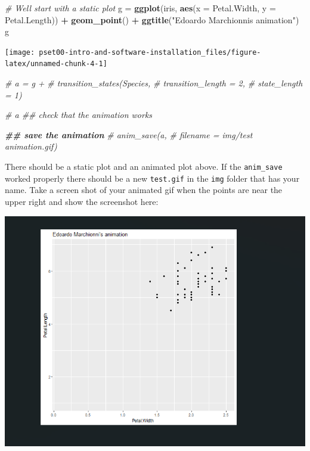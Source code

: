 \documentclass[
]{article}
\newenvironment{Shaded}{\begin{snugshade}}{\end{snugshade}}
\newcommand{\AttributeTok}[1]{\textcolor[rgb]{0.13,0.29,0.53}{#1}}
\newcommand{\CommentTok}[1]{\textcolor[rgb]{0.56,0.35,0.01}{\textit{#1}}}
\newcommand{\DocumentationTok}[1]{\textcolor[rgb]{0.56,0.35,0.01}{\textbf{\textit{#1}}}}
\newcommand{\FunctionTok}[1]{\textcolor[rgb]{0.13,0.29,0.53}{\textbf{#1}}}
\newcommand{\NormalTok}[1]{#1}
\newcommand{\OtherTok}[1]{\textcolor[rgb]{0.56,0.35,0.01}{#1}}
\newcommand{\SpecialCharTok}[1]{\textcolor[rgb]{0.81,0.36,0.00}{\textbf{#1}}}
\newcommand{\StringTok}[1]{\textcolor[rgb]{0.31,0.60,0.02}{#1}}
\begin{document}
\begin{Shaded}
\begin{Highlighting}[]
\CommentTok{\# We\textquotesingle{}ll start with a static plot}
\NormalTok{g }\OtherTok{=} \FunctionTok{ggplot}\NormalTok{(iris, }
            \FunctionTok{aes}\NormalTok{(}\AttributeTok{x =}\NormalTok{ Petal.Width, }
                \AttributeTok{y =}\NormalTok{ Petal.Length)) }\SpecialCharTok{+} 
  \FunctionTok{geom\_point}\NormalTok{() }\SpecialCharTok{+} 
  \FunctionTok{ggtitle}\NormalTok{(}\StringTok{"Edoardo Marchionni\textquotesingle{}s animation"}\NormalTok{)}
\NormalTok{g}
\end{Highlighting}
\end{Shaded}

\begin{center}\texttt{[image: pset00-intro-and-software-installation\_files/figure-latex/unnamed-chunk-4-1]} \end{center}

\begin{Shaded}
\begin{Highlighting}[]
\CommentTok{\# a = g + }
\CommentTok{\#   transition\_states(Species,}
\CommentTok{\#                     transition\_length = 2,}
\CommentTok{\#                     state\_length = 1)}

\CommentTok{\# a  \#\# check that the animation works}

\DocumentationTok{\#\# save the animation}
\CommentTok{\# anim\_save(a,}
\CommentTok{\#           filename = \textquotesingle{}img/test animation.gif\textquotesingle{})}
\end{Highlighting}
\end{Shaded}

There should be a static plot and an animated plot above. If the
\texttt{anim\_save} worked properly there should be a new
\texttt{test.gif} in the \texttt{img} folder that has your name. Take a
screen shot of your animated gif when the points are near the upper
right and show the screenshot here:

\includegraphics{img/Screenshot 2024-01-23 100647.png}
\end{document}
